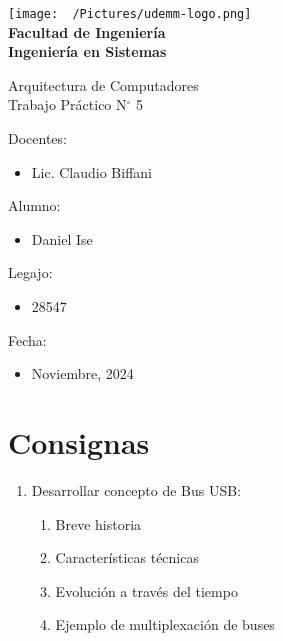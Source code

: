 \documentclass[12pt]{article}
\begin{document}
\thispagestyle{empty}

\begin{center}
	\vspace*{.5cm}
	\texttt{[image: ~/Pictures/udemm-logo.png]}\\
	\vspace{.2cm}
	\Large
	\textbf{Facultad de Ingeniería}\\
	\textbf{Ingeniería en Sistemas}\\
	\vspace{2cm}

	\Huge
	Arquitectura de Computadores\\
	Trabajo Práctico N\(^\circ\) 5\\
	\vfill

	\raggedright
	\Large
	Docentes:
	\begin{itemize}
		\item[] Lic. Claudio Biffani \\
	\end{itemize}
	Alumno:
	\begin{itemize}
		\item[] Daniel Ise
	\end{itemize}
	Legajo:
	\begin{itemize}
		\item[] 28547
	\end{itemize}
	Fecha:
	\begin{itemize}
		\item[] Noviembre, 2024
	\end{itemize}
\end{center}

\pagebreak

\section{Consignas}

\begin{enumerate}
	\item Desarrollar concepto de Bus USB:
	\begin{enumerate}
		\item Breve historia
		\item Características técnicas
		\item Evolución a través del tiempo
		\item Ejemplo de multiplexación de buses
	\end{enumerate}
\end{enumerate}
\end{document}
